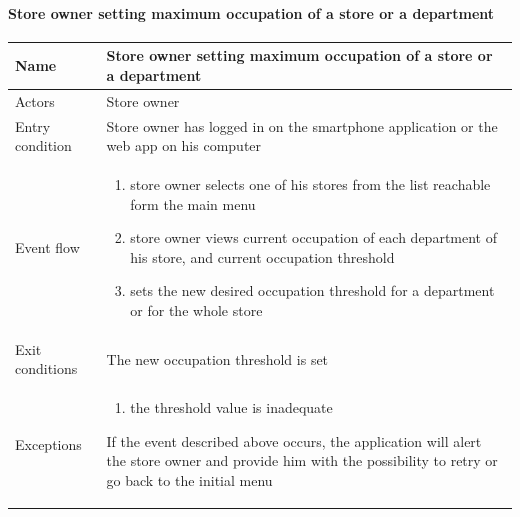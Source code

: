 \paragraph{Store owner setting maximum occupation of a store or a department}
\begin{flushleft}
	\begin{tabular} { | m{3cm} | m{10cm} | }
		\hline
		Name & Store owner setting maximum occupation of a store or a department\\
		\hline
		Actors & Store owner\\
		\hline
		Entry condition & Store owner has logged in on the smartphone application or the web app on his computer\\
		\hline
		Event flow & \begin{enumerate}
			\item store owner selects one of his stores from the list reachable form the main menu
			\item store owner views current occupation of each department of his store, and current occupation threshold
			\item sets the new desired occupation threshold for a department or for the whole store
		\end{enumerate}\\
		\hline
		Exit conditions & The new occupation threshold is set\\
		\hline
		Exceptions & \begin{enumerate}
			\item the threshold value is inadequate
		\end{enumerate}
		If the event described above occurs, the application will alert the store owner and provide him with the possibility to retry or go back to the initial menu\\
		\hline
	\end{tabular}
\end{flushleft}
